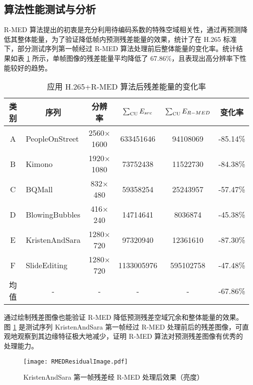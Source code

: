 \subsection{算法性能测试与分析}
R-MED 算法提出的初衷是充分利用待编码系数的特殊空域相关性，通过再预测降低其整体能量，为了验证降低帧内预测残差能量的效果，统计了在 H.265 标准下，部分测试序列第一帧经过 R-MED 算法处理前后整体能量的变化率。统计结果如表 \ref{tab:RMEDEnergy} 所示，单帧图像的残差能量平均降低了 67.86\%，且表现出高分辨率下性能较好的趋势。
\begin{table}[]
    \centering
    \caption{应用 H.265+R-MED 算法后残差能量的变化率}
    \label{tab:RMEDEnergy}
    \begin{tabular}{@{}clcccc@{}}
        \toprule
        类别 & \multicolumn{1}{c}{序列} & 分辨率           & $\sum_{\rm CU}E_{src}$ & $\sum_{\rm CU}E_{R-MED}$ & 变化率   \\ \midrule
        A    & PeopleOnStreet           & 2560$\times$1600 & 633451646              & 94108069                 & -85.14\% \\
        B    & Kimono                   & 1920$\times$1080 & 73752438               & 11522730                 & -84.38\% \\
        C    & BQMall                   & 832$\times$480   & 59358254               & 25243957                 & -57.47\% \\
        D    & BlowingBubbles           & 416$\times$240   & 14714641               & 8036874                  & -45.38\% \\
        E    & KristenAndSara           & 1280$\times$720  & 97320940               & 12361610                 & -87.30\% \\
        F    & SlideEditing             & 1280$\times$720  & 1133005976             & 595102758                & -47.48\% \\ \midrule
        均值 & \multicolumn{1}{c}{-}    & -                & -                      & -                        & -67.86\% \\ \bottomrule
    \end{tabular}
\end{table}
通过绘制残差图像也能验证 R-MED 降低预测残差空域冗余和整体能量的效果。图 \ref{fig:RMEDResidualImage} 是测试序列 KristenAndSara 第一帧经过 R-MED 处理前后的残差图像，可直观地观察到其边缘特征极大地减少，证明 R-MED 算法对预测残差图像有优秀的处理能力。
\begin{figure}[hbt]
    \centering
    \texttt{[image: RMEDResidualImage.pdf]}
    \caption{KristenAndSara 第一帧残差经 R-MED 处理后效果（亮度）}
    \label{fig:RMEDResidualImage}
\end{figure}

